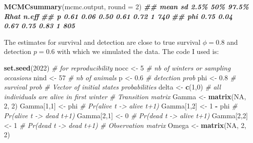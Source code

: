 \documentclass[
  12pt,
]{krantz}
\newenvironment{Shaded}{\begin{snugshade}}{\end{snugshade}}
\newcommand{\AttributeTok}[1]{\textcolor[rgb]{0.13,0.29,0.53}{#1}}
\newcommand{\CommentTok}[1]{\textcolor[rgb]{0.56,0.35,0.01}{\textit{#1}}}
\newcommand{\ConstantTok}[1]{\textcolor[rgb]{0.56,0.35,0.01}{#1}}
\newcommand{\DecValTok}[1]{\textcolor[rgb]{0.00,0.00,0.81}{#1}}
\newcommand{\DocumentationTok}[1]{\textcolor[rgb]{0.56,0.35,0.01}{\textbf{\textit{#1}}}}
\newcommand{\FloatTok}[1]{\textcolor[rgb]{0.00,0.00,0.81}{#1}}
\newcommand{\FunctionTok}[1]{\textcolor[rgb]{0.13,0.29,0.53}{\textbf{#1}}}
\newcommand{\NormalTok}[1]{#1}
\newcommand{\OtherTok}[1]{\textcolor[rgb]{0.56,0.35,0.01}{#1}}
\newcommand{\SpecialCharTok}[1]{\textcolor[rgb]{0.81,0.36,0.00}{\textbf{#1}}}
\begin{document}
\begin{Shaded}
\begin{Highlighting}[]
\FunctionTok{MCMCsummary}\NormalTok{(mcmc.output, }\AttributeTok{round =} \DecValTok{2}\NormalTok{)}
\DocumentationTok{\#\#     mean   sd 2.5\%  50\% 97.5\% Rhat n.eff}
\DocumentationTok{\#\# p   0.61 0.06 0.50 0.61  0.72    1   740}
\DocumentationTok{\#\# phi 0.75 0.04 0.67 0.75  0.83    1   805}
\end{Highlighting}
\end{Shaded}

The estimates for survival and detection are close to true survival \(\phi = 0.8\) and detection \(p = 0.6\) with which we simulated the data. The code I used is:

\begin{Shaded}
\begin{Highlighting}[]
\FunctionTok{set.seed}\NormalTok{(}\DecValTok{2022}\NormalTok{) }\CommentTok{\# for reproducibility}
\NormalTok{nocc }\OtherTok{\textless{}{-}} \DecValTok{5} \CommentTok{\# nb of winters or sampling occasions}
\NormalTok{nind }\OtherTok{\textless{}{-}} \DecValTok{57} \CommentTok{\# nb of animals}
\NormalTok{p }\OtherTok{\textless{}{-}} \FloatTok{0.6} \CommentTok{\# detection prob}
\NormalTok{phi }\OtherTok{\textless{}{-}} \FloatTok{0.8} \CommentTok{\# survival prob}
\CommentTok{\# Vector of initial states probabilities}
\NormalTok{delta }\OtherTok{\textless{}{-}} \FunctionTok{c}\NormalTok{(}\DecValTok{1}\NormalTok{,}\DecValTok{0}\NormalTok{) }\CommentTok{\# all individuals are alive in first winter}
\CommentTok{\# Transition matrix}
\NormalTok{Gamma }\OtherTok{\textless{}{-}} \FunctionTok{matrix}\NormalTok{(}\ConstantTok{NA}\NormalTok{, }\DecValTok{2}\NormalTok{, }\DecValTok{2}\NormalTok{)}
\NormalTok{Gamma[}\DecValTok{1}\NormalTok{,}\DecValTok{1}\NormalTok{] }\OtherTok{\textless{}{-}}\NormalTok{ phi      }\CommentTok{\# Pr(alive t {-}\textgreater{} alive t+1)}
\NormalTok{Gamma[}\DecValTok{1}\NormalTok{,}\DecValTok{2}\NormalTok{] }\OtherTok{\textless{}{-}} \DecValTok{1} \SpecialCharTok{{-}}\NormalTok{ phi  }\CommentTok{\# Pr(alive t {-}\textgreater{} dead t+1)}
\NormalTok{Gamma[}\DecValTok{2}\NormalTok{,}\DecValTok{1}\NormalTok{] }\OtherTok{\textless{}{-}} \DecValTok{0}        \CommentTok{\# Pr(dead t {-}\textgreater{} alive t+1)}
\NormalTok{Gamma[}\DecValTok{2}\NormalTok{,}\DecValTok{2}\NormalTok{] }\OtherTok{\textless{}{-}} \DecValTok{1}        \CommentTok{\# Pr(dead t {-}\textgreater{} dead t+1)}
\CommentTok{\# Observation matrix }
\NormalTok{Omega }\OtherTok{\textless{}{-}} \FunctionTok{matrix}\NormalTok{(}\ConstantTok{NA}\NormalTok{, }\DecValTok{2}\NormalTok{, }\DecValTok{2}\NormalTok{)}

\end{Highlighting}
\end{Shaded}
\end{document}
